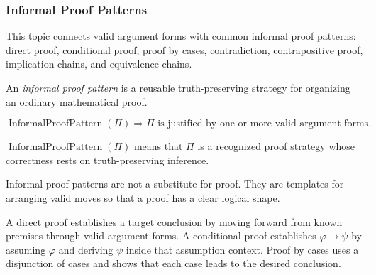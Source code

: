 \subsubsection*{Informal Proof Patterns}

\begin{remark*}
This topic connects valid argument forms with common informal proof patterns:
direct proof, conditional proof, proof by cases, contradiction, contrapositive
proof, implication chains, and equivalence chains.
\end{remark*}

\begin{tcolorbox}[colback=propbox, colframe=propborder, arc=2pt,
  left=6pt, right=6pt, top=4pt, bottom=4pt,
  title={\small\textbf{Definition (Informal Proof Pattern)}},
  fonttitle=\small\bfseries]
\begin{definition}
\label{def:informal-proof-pattern-propositional-logic}
An \emph{informal proof pattern} is a reusable truth-preserving strategy for
organizing an ordinary mathematical proof.
\end{definition}
\end{tcolorbox}

\begin{remark*}
\[
\operatorname{InformalProofPattern}(\Pi)
\Longrightarrow
\Pi\text{ is justified by one or more valid argument forms.}
\]
\end{remark*}

\begin{remark*}
\(\operatorname{InformalProofPattern}(\Pi)\) means that \(\Pi\) is a recognized
proof strategy whose correctness rests on truth-preserving inference.
\end{remark*}

\begin{remark*}[Interpretation]
Informal proof patterns are not a substitute for proof. They are templates for
arranging valid moves so that a proof has a clear logical shape.
\end{remark*}

\begin{remark*}[Exposition]
A direct proof establishes a target conclusion by moving forward from known
premises through valid argument forms. A conditional proof establishes
\(\varphi\to\psi\) by assuming \(\varphi\) and deriving \(\psi\) inside that
assumption context. Proof by cases uses a disjunction of cases and shows that
each case leads to the desired conclusion.
\end{remark*}

